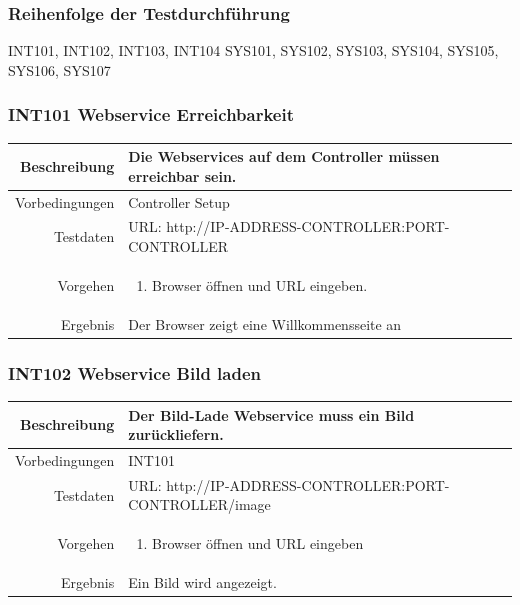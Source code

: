 \subsubsection{Reihenfolge der Testdurchführung}
INT101, INT102, INT103, INT104
SYS101, SYS102, SYS103, SYS104, SYS105, SYS106, SYS107




\subsubsection{INT101 Webservice Erreichbarkeit}
\begin{table}[h!]
	\renewcommand{\arraystretch}{1.5}
	\begin{tabular}{|r|p{14cm}|}
		\hline Beschreibung & Die Webservices auf dem Controller müssen erreichbar sein. \\ 
		\hline Vorbedingungen & Controller Setup \\ 
		\hline Testdaten & URL: http://IP-ADDRESS-CONTROLLER:PORT-CONTROLLER \\ 
		\hline Vorgehen & 
		\begin{enumerate}
			\item Browser öffnen und URL eingeben.
		\end{enumerate} \\ 
		\hline Ergebnis & Der Browser zeigt eine Willkommensseite an \\ 
		\hline 
	\end{tabular}
\end{table}

\subsubsection{INT102 Webservice Bild laden}
\begin{table}[h!]
	\renewcommand{\arraystretch}{1.5}
	\begin{tabular}{|r|p{14cm}|}
		\hline Beschreibung & Der Bild-Lade Webservice muss ein Bild zurückliefern. \\ 
		\hline Vorbedingungen & INT101 \\ 
		\hline Testdaten & URL: http://IP-ADDRESS-CONTROLLER:PORT-CONTROLLER/image \\ 
		\hline Vorgehen & 
		\begin{enumerate}
			\item Browser öffnen und URL eingeben
		\end{enumerate} \\ 
		\hline Ergebnis & Ein Bild wird angezeigt. \\ 
		\hline 
	\end{tabular}
\end{table}
\newpage

